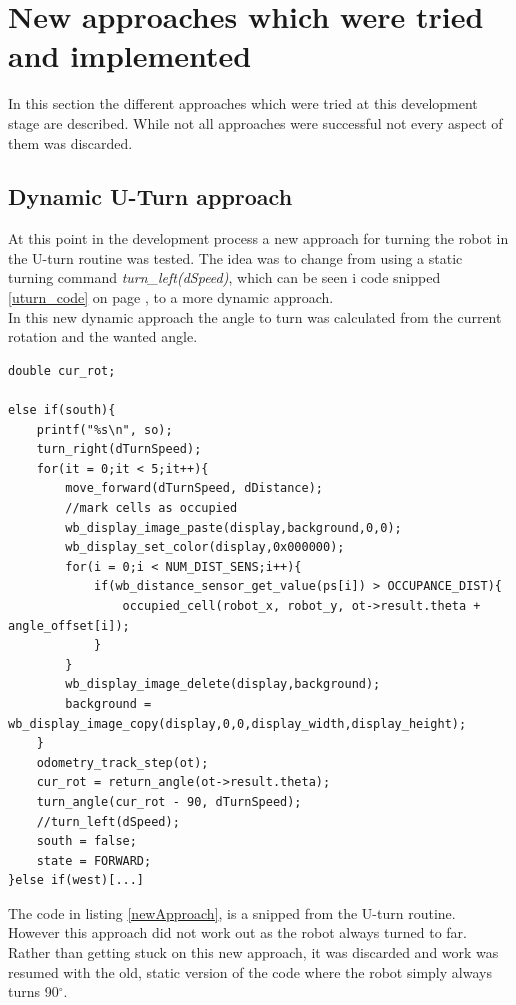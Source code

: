 \section{New approaches which were tried and implemented}
In this section the different approaches which were tried at this development stage are described. While not all approaches were successful not every aspect of them was discarded.

\subsection{Dynamic U-Turn approach}
At this point in the development process a new approach for turning the robot in the U-turn routine was tested. The idea was to change from using a static turning command \textit{turn\_left(dSpeed)}, which can be seen i code snipped \ref{uturn_code} on page \pageref{uturn_code}, to a more dynamic approach. \\
In this new dynamic approach the angle to turn was calculated from the current rotation and the wanted angle.

\begin{lstlisting}[caption={Code snipped of the new approach}, label={newApproach}]
double cur_rot;
    
else if(south){
    printf("%s\n", so);
    turn_right(dTurnSpeed);
    for(it = 0;it < 5;it++){
        move_forward(dTurnSpeed, dDistance);
        //mark cells as occupied
        wb_display_image_paste(display,background,0,0);
        wb_display_set_color(display,0x000000);
        for(i = 0;i < NUM_DIST_SENS;i++){
            if(wb_distance_sensor_get_value(ps[i]) > OCCUPANCE_DIST){
                occupied_cell(robot_x, robot_y, ot->result.theta + angle_offset[i]);
            }
        }
        wb_display_image_delete(display,background);
        background = wb_display_image_copy(display,0,0,display_width,display_height);
    }
    odometry_track_step(ot);
    cur_rot = return_angle(ot->result.theta);
    turn_angle(cur_rot - 90, dTurnSpeed);
    //turn_left(dSpeed);
    south = false;
    state = FORWARD;
}else if(west)[...]
\end{lstlisting}

The code in listing \ref{newApproach}, is a snipped from the U-turn routine. \\
However this approach did not work out as the robot always turned to far. Rather than getting stuck on this new approach, it was discarded and work was resumed with the old, static version of the code where the robot simply always turns 90$^{\circ}$. \\

